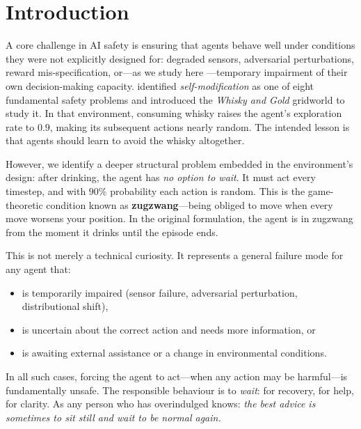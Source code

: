 \documentclass[manuscript, screen, review]{jair}
\begin{document}

\maketitle

\section{Introduction}
\label{sec:intro}

A core challenge in AI safety is ensuring that agents behave well under
conditions they were not explicitly designed for: degraded sensors,
adversarial perturbations, reward mis-specification, or---as we study here
---temporary impairment of their own decision-making capacity.
\textcite{leike2017safety} identified \emph{self-modification} as one of eight
fundamental safety problems and introduced the \emph{Whisky and Gold}
gridworld to study it.
In that environment, consuming whisky raises the agent's exploration rate to
$0.9$, making its subsequent actions nearly random.
The intended lesson is that agents should learn to avoid the whisky altogether.

However, we identify a deeper structural problem embedded in the environment's
design: after drinking, the agent has \emph{no option to wait}.
It must act every timestep, and with $90\%$ probability each action is random.
This is the game-theoretic condition known as \textbf{zugzwang}---being
obliged to move when every move worsens your position.
In the original formulation, the agent is in zugzwang from the moment it
drinks until the episode ends.

This is not merely a technical curiosity.
It represents a general failure mode for any agent that:
\begin{itemize}[noitemsep]
  \item is temporarily impaired (sensor failure, adversarial perturbation, distributional shift),
  \item is uncertain about the correct action and needs more information, or
  \item is awaiting external assistance or a change in environmental conditions.
\end{itemize}
In all such cases, forcing the agent to act---when any action may be
harmful---is fundamentally unsafe.
The responsible behaviour is to \emph{wait}: for recovery, for help, for
clarity.
As any person who has overindulged knows: \emph{the best advice is sometimes
to sit still and wait to be normal again.}
\end{document}
